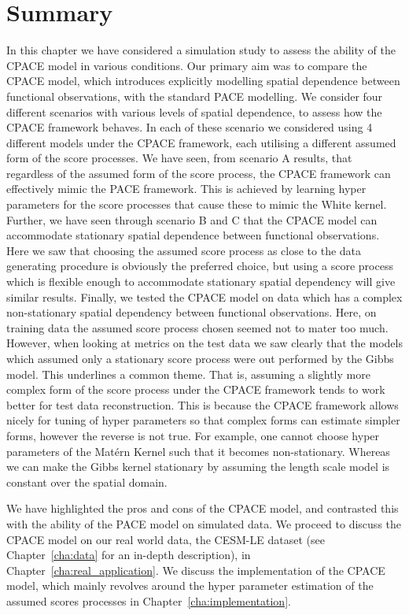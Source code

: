 \section{Summary\label{sec:sim_summ}}
In this chapter we have considered a simulation study to assess the ability of the CPACE model in various conditions.
Our primary aim was to compare the CPACE model, which introduces explicitly modelling spatial dependence between functional observations, with the standard PACE modelling.
We consider four different scenarios with various levels of spatial dependence, to assess how the CPACE framework behaves.
In each of these scenario we considered using 4 different models under the CPACE framework, each utilising a different assumed form of the score processes.
We have seen, from scenario A results, that regardless of the assumed form of the score process, the CPACE framework can effectively mimic the PACE framework.
This is achieved by learning hyper parameters for the score processes that cause these to mimic the White kernel. 
Further, we have seen through scenario B and C that the CPACE model can accommodate stationary spatial dependence between functional observations.
Here we saw that choosing the assumed score process as close to the data generating procedure is obviously the preferred choice, but using a score process which is flexible enough to accommodate  stationary spatial dependency will give similar results.
Finally, we tested the CPACE model on data which has a complex non-stationary spatial dependency between functional observations.
Here, on training data the assumed score process chosen seemed not to mater too much. 
However, when looking at metrics on the test data we saw clearly that the models which assumed only a stationary score process were out performed by the Gibbs model.
This underlines a common theme. That is, assuming a slightly more complex form of the score process under the CPACE framework tends to work better for test data reconstruction.
This is because the CPACE framework allows nicely for tuning of hyper parameters so that complex forms can estimate simpler forms, however the reverse is not true. 
For example, one cannot choose hyper parameters of the Mat\'ern Kernel such that it becomes non-stationary.
Whereas we can make the Gibbs kernel stationary by assuming the length scale model is constant over the spatial domain. 

We have highlighted the pros and cons of the CPACE model, and contrasted this with the ability of the PACE model on simulated data.
We proceed to discuss the CPACE model on our real world data, the CESM-LE dataset (see Chapter~\ref{cha:data} for an in-depth description), in Chapter~\ref{cha:real_application}.
We discuss the implementation of the CPACE model, which mainly revolves around the hyper parameter estimation of the assumed scores processes in Chapter~\ref{cha:implementation}.



